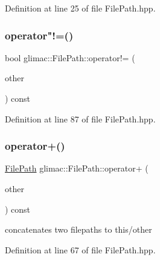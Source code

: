 Definition at line 25 of file File\+Path.\+hpp.

\mbox{\label{classglimac_1_1_file_path_aa1806dd19789add295b934e4ab52b296}} 
\subsubsection{\texorpdfstring{operator"!=()}{operator!=()}}
{\footnotesize\ttfamily bool glimac\+::\+File\+Path\+::operator!= (\begin{DoxyParamCaption}\item[{const \hyperlink{classglimac_1_1_file_path}{File\+Path} \&}]{other }\end{DoxyParamCaption}) const\hspace{0.3cm}{\ttfamily [inline]}}



Definition at line 87 of file File\+Path.\+hpp.

\mbox{\label{classglimac_1_1_file_path_a8113825c73d8a8f1f1cf3ca57de6bad8}} 
\subsubsection{\texorpdfstring{operator+()}{operator+()}}
{\footnotesize\ttfamily \hyperlink{classglimac_1_1_file_path}{File\+Path} glimac\+::\+File\+Path\+::operator+ (\begin{DoxyParamCaption}\item[{const \hyperlink{classglimac_1_1_file_path}{File\+Path} \&}]{other }\end{DoxyParamCaption}) const\hspace{0.3cm}{\ttfamily [inline]}}

concatenates two filepaths to this/other 

Definition at line 67 of file File\+Path.\+hpp.

\mbox{\label{classglimac_1_1_file_path_a1d7c3a1f124fe5e637d7584a46ceef91}} 
